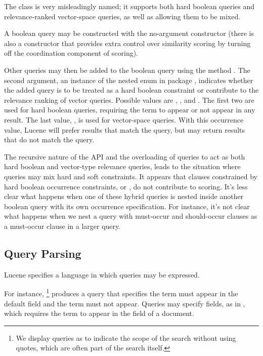 The  class is very misleadingly named; it
supports both hard boolean queries and relevance-ranked vector-space
queries, as well as allowing them to be mixed.

A boolean query may be constructed with the no-argument constructor
 (there is also a constructor that provides extra
control over similarity scoring by turning off the coordination component
of scoring).

Other queries may then be added to the boolean query using the method
.  The second argument, an
instance of the nested enum  in package
, indicates whether the added query is to be treated as a
hard boolean constraint or contribute to the relevance ranking of
vector queries.  Possible values are ,
, and .  The
first two are used for hard boolean queries, requiring the term to
appear or not appear in any result.  The last value, , is
used for vector-space queries.  With this occurrence value, Lucene
will prefer results that match the query, but may return results that
do not match the query.%

The recursive nature of the API and the overloading of queries to act
as both hard boolean and vector-type relevance queries, leads to the
situation where queries may mix hard and soft constraints.  It appears
that clauses constrained by hard boolean occurrence constraints,
 or , do not contribute to scoring.  It's
less clear what happens when one of these hybrid queries is nested
inside another boolean query with its own occurrence specification.
For instance, it's not clear what happens when we nest a query with
must-occur and should-occur clauses as a must-occur clause in a larger
query.
%


\subsection{Query Parsing}

Lucene specifies a language in which queries may be expressed.  

For instance, %
%
\footnote{We display queries  as  to
indicate the scope of the search without using quotes, which are often
part of the search itself.}
%
produces a query that specifies the term  must
appear in the default field and the term  must not
appear.  Queries may specify fields, as in ,
which requires the term  to appear in the
 field of a document.

